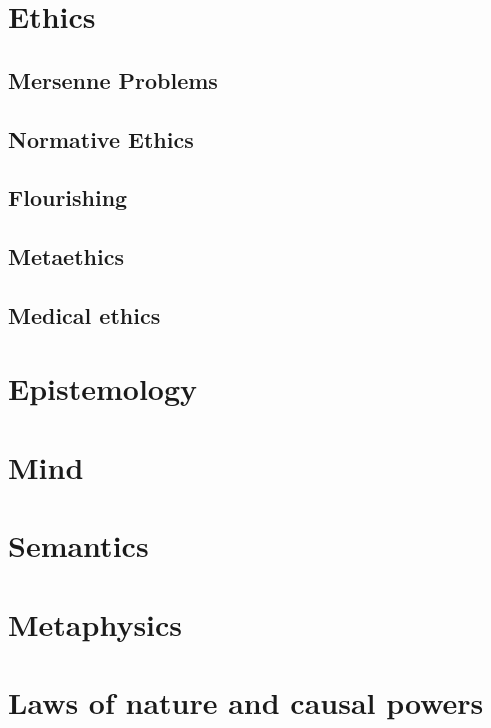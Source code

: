 \def\mychapter{II}

\chapter{Ethics}\label{ch:ethics}
\section{Mersenne Problems}
\section{Normative Ethics}
\section{Flourishing}
\section{Metaethics}
\section{Medical ethics}
\chaptertail 

\def\mychapter{III}

\chapter{Epistemology}\label{ch:epistemology}
\chaptertail 

\def\mychapter{IV}

\chapter{Mind}\label{ch:mind}
\chaptertail 

\def\mychapter{V}

\chapter{Semantics}\label{ch:semantics}
\chaptertail

\def\mychapter{VI}

\chapter{Metaphysics}\label{ch:metaphysics}
\chaptertail 

\def\mychapter{VII}

\chapter{Laws of nature and causal powers}\label{ch:laws}
\chaptertail


